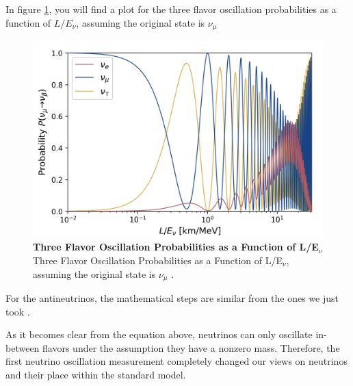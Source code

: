 In figure \ref{fig:nu_osc_prob}, you will find a plot for the three flavor oscillation probabilities as a function of $L/E_{\nu}$, assuming the original state is $\nu_{\mu}$

\begin{figure}[h!]
	\begin{center}
		\includegraphics[scale=0.2]{Figures/three_flavor_osc.jpg}
		\caption[Three Flavor Oscillation Model]{\textbf{Three Flavor Oscillation Probabilities as a Function of L/E$_{\nu}$} \\Three Flavor Oscillation Probabilities as a Function of L/E$_{\nu}$, assuming the original state is $\nu_{\mu}$ \cite{Lauren_thesis}.}
		\label{fig:nu_osc_prob}
	\end{center}
\end{figure}

For the antineutrinos, the mathematical steps are similar from the ones we just took \cite{oscillation_math}. 

As it becomes clear from the equation above, neutrinos can only oscillate in-between flavors under the assumption they have a nonzero mass. Therefore, the first neutrino oscillation measurement completely changed our views on neutrinos and their place within the standard model. 

